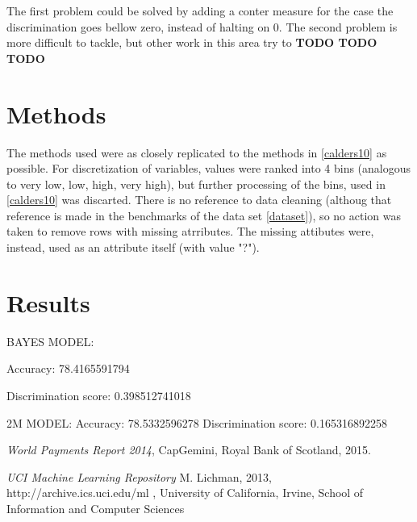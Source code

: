 \documentclass[paper=a4, fontsize=11pt]{scrartcl} %
\numberwithin{equation}{section} %
\numberwithin{figure}{section} %
\numberwithin{table}{section} %
\begin{document}
The first problem could be solved by adding a conter measure for the case the discrimination goes bellow zero, instead of halting on 0.
The second problem is more difficult to tackle, but other work in this area try to \textbf{TODO TODO TODO}

\section{Methods}
The methods used were as closely replicated to the methods in \ref{calders10} as possible. For discretization of variables, values were ranked into 4 bins (analogous to very low, low, high, very high), but further processing of the bins, used in \ref{calders10} was discarted. There is no reference to data cleaning (althoug that reference is made in the benchmarks of the data set \ref{dataset}), so no action was taken to remove rows with missing atrributes. The missing attibutes were, instead, used as an attribute itself (with value "?"). 

\section{Results}


BAYES MODEL:

Accuracy: 78.4165591794 

Discrimination score: 0.398512741018 


2M MODEL:
Accuracy: 78.5332596278 
Discrimination score: 0.165316892258 


\begin{thebibliography}{9} 

 \emph{World Payments Report 2014}, CapGemini, Royal Bank of Scotland, 2015.

 \emph{{UCI} Machine Learning Repository}
M. Lichman, 2013, http://archive.ics.uci.edu/ml , University of California, Irvine, School of Information and Computer Sciences


\end{thebibliography}
\end{document}
